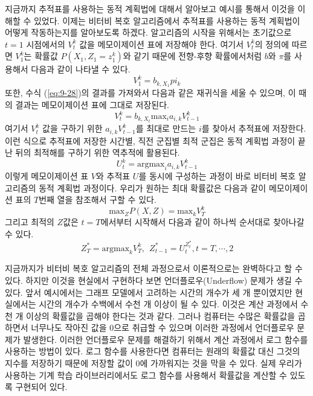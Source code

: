 \documentclass[a4paper]{oblivoir}
\begin{document}
지금까지 추적표를 사용하는 동적 계획법에 대해서 알아보고 예시를 통해서 이것을 이해할 수 있었다. 이제는 비터비 복호 알고리즘에서 추적표를 사용하는 동적 계획법이 어떻게 작동하는지를 알아보도록 하겠다. 알고리즘의 시작을 위해서는 초기값으로 $t=1$ 시점에서의 $V_{t}^{k}$ 값을 메모이제이션 표에 저장해야 한다. 여기서 $V_{t}^{k}$의 정의에 따르면 $V_{1}^{k}$는 확률값 $P(X_1, Z_1=z_{1}^{k})$와 같기 때문에 전향-후향 확률에서처럼 $b$와 $\pi$를 사용해서 다음과 같이 나타낼 수 있다. 
\begin{equation}
V_{1}^{k} = b_{k,X_1} pi_{k}
\label{eq:9-29}
\end{equation}
또한, 수식 (\ref{eq:9-28})의 결과를 가져와서 다음과 같은 재귀식을 세울 수 있으며, 이 때의 결과는 메모이제이션 표에 그대로 저장된다. 
\begin{equation}
V_{t}^{k} = b_{k,X_{t}} \textrm{max}_{i} a_{i,k} V_{t-1}^{k}
\label{eq:9-30}
\end{equation}
여기서 $V_{t}^{k}$ 값을 구하기 위한 $a_{i,k} V_{t-1}^{k}$를 최대로 만드는 $i$를 찾아서 추적표에 저장한다. 이런 식으로 추적표에 저장한 시간별, 직전 군집별 최적 군집은 동적 계획법 과정이 끝난 뒤의 최적해를 구하기 위한 역추적에 활용된다. 
\begin{equation}
U_{t}^{k} = \textrm{argmax}_{i} a_{i,k} V_{t-1}^{k}
\label{eq:9-31}
\end{equation}
이렇게 메모이제이션 표 $V$와 추적표 $U$를 동시에 구성하는 과정이 바로 비터비 복호 알고리즘의 동적 계획법 과정이다. 우리가 원하는 최대 확률값은 다음과 같이 메모이제이션 표의 $T$번째 열을 참조해서 구할 수 있다. 
\begin{equation}
\textrm{max}_{Z} P(X,Z) = \textrm{max}_{k} V_{T}^{k}
\label{eq:9-32}
\end{equation}
그리고 최적의 $Z$값은 $t=T$에서부터 시작해서 다음과 같이 하나씩 순서대로 찾아나갈 수 있다. 
\begin{equation}
Z_{T}^{*} = \textrm{argmax}_{k} V_{T}^{k}, \ \ Z_{t-1}^{*} = U_{t}^{Z_{t}^{*}}, t=T,\cdots,2
\label{eq:9-33}
\end{equation} 

지금까지가 비터비 복호 알고리즘의 전체 과정으로서 이론적으로는 완벽하다고 할 수 있다. 하지만 이것을 현실에서 구현하다 보면 언더플로우(Underflow) 문제가 생길 수 있다. 앞서 예시에서는 그래프 모델에서 고려하는 시간의 개수가 세 개 뿐이였지만 현실에서는 시간의 개수가 수백에서 수천 개 이상이 될 수 있다. 이것은 계산 과정에서 수천 개 이상의 확률값을 곱해야 한다는 것과 같다. 그러나 컴퓨터는 수많은 확률값을 곱하면서 너무나도 작아진 값을 0으로 취급할 수 있으며 이러한 과정에서 언더플로우 문제가 발생한다. 이러한 언더플로우 문제를 해결하기 위해서 계산 과정에서 로그 함수를 사용하는 방법이 있다. 로그 함수를 사용한다면 컴퓨터는 원래의 확률값 대신 그것의 지수를 저장하기 때문에 저장할 값이 0에 가까워지는 것을 막을 수 있다. 실제 우리가 사용하는 기계 학습 라이브러리에서도 로그 함수를 사용해서 확률값을 계산할 수 있도록 구현되어 있다. \\
\end{document}
